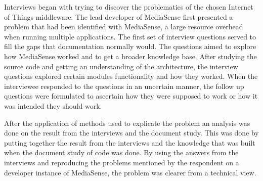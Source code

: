 Interviews began with trying to discover the problematics of the chosen Internet of Things middleware. The lead developer of MediaSense first presented a problem that had been identified with MediaSense, a large resource overhead when running multiple applications. The first set of interview questions served to fill the gaps that documentation normally would. The questions aimed to explore how MediaSense worked and to get a broader knowledge base. After studying the source code and getting an understanding of the architecture, the interview questions explored certain modules functionality and how they worked. When the interviewee responded to the questions in an uncertain manner, the follow up questions were formulated to ascertain how they were supposed to work or how it was intended they should work.

After the application of methods used to explicate the problem an analysis was done on the result from the interviews and the document study. This was done by putting together the result from the interviews and the knowledge that was built when the document study of code was done. By using the answers from the interviews and reproducing the problems mentioned by the respondent on a developer instance of MediaSense, the problem was clearer from a technical view.
